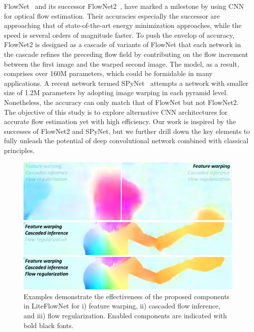 \documentclass[10pt,twocolumn,letterpaper]{article}
\begin{document}
FlowNet~\cite{Fischer15} and its successor FlowNet2~\cite{Ilg17}, have marked a milestone by using CNN for optical flow estimation. Their accuracies especially the successor are approaching that of state-of-the-art energy minimization approaches, while the speed is several orders of magnitude faster.
%
To push the envelop of accuracy, FlowNet2 is designed as a cascade of variants of FlowNet that each network in the cascade refines the preceding flow field by contributing on the flow increment between the first image and the warped second image. The model, as a result, comprises over 160M parameters, which could be formidable in many applications.
%
A recent network termed SPyNet~\cite{Ranjan17} attempts a network with smaller size of 1.2M parameters by adopting image warping in each pyramid level. Nonetheless, the accuracy can only match that of FlowNet but not FlowNet2. 
%
The objective of this study is to explore alternative CNN architectures for accurate flow estimation yet with high efficiency.
%
Our work is inspired by the successes of FlowNet2 and SPyNet, but we further drill down the key elements to fully unleash the potential of deep convolutional network combined with classical principles. 

\begin{figure}[t]
\centering
   \includegraphics[width=\linewidth]{figure/overview.pdf}
\caption{Examples demonstrate the effectiveness of the proposed components in LiteFlowNet for i) feature warping, ii) cascaded flow inference, and iii) flow regularization. Enabled components are indicated with bold black fonts.}
\label{fig:overview}
\end{figure}
\end{document}
